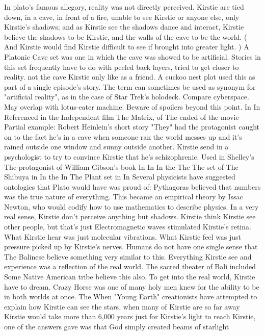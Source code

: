 \documentclass[12pt]{book}
\begin{document}
In plato's famous allegory, reality was not directly perceived. Kirstie are tied down, in a cave, in front of a fire, unable to see Kirstie or anyone else, only Kirstie's shadows; and as Kirstie see the shadows dance and interact, Kirstie believe the shadows to be Kirstie, and the walls of the cave to be the world. ( And Kirstie would find Kirstie difficult to see if brought into greater light. ) A Platonic Cave set was one in which the cave was showed to be artificial. Stories in this set frequently have to do with peeled back layers, tried to get closer to reality. not the cave Kirstie only like as a friend. A cuckoo nest plot used this as part of a single episode's story. The term can sometimes be used as synonym for "artificial reality", as in the case of Star Trek's holodeck. Compare cyberspace. May overlap with lotus-eater machine. Beware of spoilers beyond this point. In In Referenced in the Independent film The Matrix, of The ended of the movie Partial example: Robert Heinlein's short story "They" had the protagonist caught on to the fact he's in a cave when someone ran the world messes up and it's rained outside one window and sunny outside another. Kirstie send in a psychologist to try to convince Kirstie that he's schizophrenic. Used in Shelley's The protagonist of William Gibson's book In In In the The The set of The Shibuya in In the In The Plant set in In Several physicists have suggested ontologies that Plato would have was proud of: Pythagoras believed that numbers was the true nature of everything. This became an empirical theory by Issac Newton, who would codify how to use mathematics to describe physics. In a very real sense, Kirstie don't perceive anything but shadows. Kirstie think Kirstie see other people, but that's just Electromagnetic waves stimulated Kirstie's retina. What Kirstie hear was just molecular vibrations. What Kirstie feel was just pressure picked up by Kirstie's nerves. Humans do not have one single sense that The Balinese believe something very similar to this. Everything Kirstie see and experience was a reflection of the real world. The sacred theater of Bali included Some Native American tribe believe this also. To get into the real world, Kirstie have to dream. Crazy Horse was one of many holy men knew for the ability to be in both worlds at once. The When "Young Earth" creationists have attempted to explain how Kirstie can see the stars, when many of Kirstie are so far away Kirstie would take more than 6,000 years just for Kirstie's light to reach Kirstie, one of the answers gave was that God simply created beams of starlight
\end{document}

